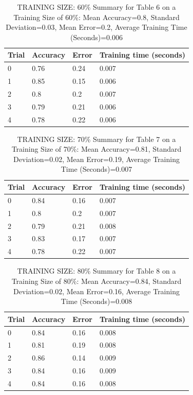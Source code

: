 \documentclass{article}
\begin{document}
\begin{table}[H]

\centering
{\begin{tabular}{||p{1cm}|p{1.8cm}|p{1.8cm}|p{3cm}||}
 \hline
Trial & Accuracy & Error & Training time (seconds) \\ [0.5ex] 
 \hline\hline
   0  & 0.76  & 0.24  & 0.007\\
\hline
   1  & 0.85  & 0.15  & 0.006\\
\hline
   2  & 0.8  & 0.2  & 0.007\\
\hline
   3  & 0.79  & 0.21  & 0.006\\
\hline
   4  & 0.78  & 0.22  & 0.006\\
 \hline
\end{tabular}}
\caption{TRAINING SIZE: 60\% \newline Summary for Table 6 on a Training Size of 60\%: Mean Accuracy=0.8, Standard Deviation=0.03, Mean Error=0.2, Average Training Time (Seconds)=0.006}
\end{table} 

\begin{table}[H]

\centering
{\begin{tabular}{||p{1cm}|p{1.8cm}|p{1.8cm}|p{3cm}||}
 \hline
Trial & Accuracy & Error & Training time (seconds) \\ [0.5ex] 
 \hline\hline
   0  & 0.84  & 0.16  & 0.007\\
\hline
   1  & 0.8  & 0.2  & 0.007\\
\hline
   2  & 0.79  & 0.21  & 0.008\\
\hline
   3  & 0.83  & 0.17  & 0.007\\
\hline
   4  & 0.78  & 0.22  & 0.007\\
 \hline
\end{tabular}}
\caption{TRAINING SIZE: 70\% \newline Summary for Table 7 on a Training Size of 70\%: Mean Accuracy=0.81, Standard Deviation=0.02, Mean Error=0.19, Average Training Time (Seconds)=0.007}
\end{table} 

\begin{table}[H]

\centering
{\begin{tabular}{||p{1cm}|p{1.8cm}|p{1.8cm}|p{3cm}||}
 \hline
Trial & Accuracy & Error & Training time (seconds) \\ [0.5ex] 
 \hline\hline
   0  & 0.84  & 0.16  & 0.008\\
\hline
   1  & 0.81  & 0.19  & 0.008\\
\hline
   2  & 0.86  & 0.14  & 0.009\\
\hline
   3  & 0.84  & 0.16  & 0.009\\
\hline
   4  & 0.84  & 0.16  & 0.008\\
 \hline
\end{tabular}}
\caption{TRAINING SIZE: 80\% \newline Summary for Table 8 on a Training Size of 80\%: Mean Accuracy=0.84, Standard Deviation=0.02, Mean Error=0.16, Average Training Time (Seconds)=0.008}
\end{table} 
\end{document}
